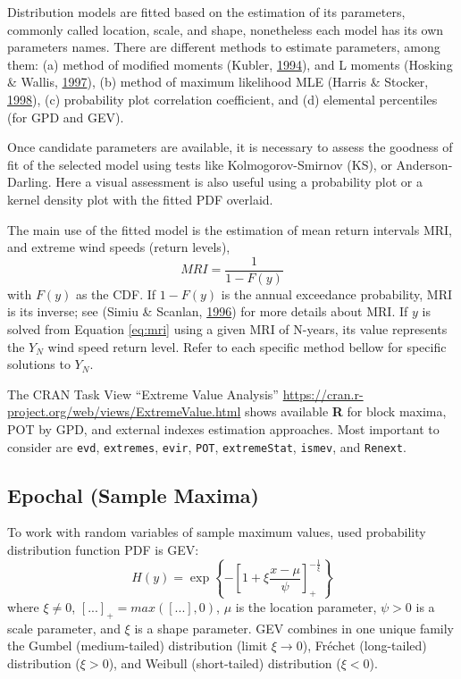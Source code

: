\documentclass[12pt,oneside]{reedthesis}
\begin{document}
Distribution models are fitted based on the estimation of its parameters, commonly called location, scale, and shape, nonetheless each model has its own parameters names. There are different methods to estimate parameters, among them: (a) method of modified moments (Kubler, \protect\hyperlink{ref-Kubler1994}{1994}), and L moments (Hosking \& Wallis, \protect\hyperlink{ref-Hosking1997}{1997}), (b) method of maximum likelihood MLE (Harris \& Stocker, \protect\hyperlink{ref-Harris1994}{1998}), (c) probability plot correlation coefficient, and (d) elemental percentiles (for GPD and GEV).

Once candidate parameters are available, it is necessary to assess the goodness of fit of the selected model using tests like Kolmogorov-Smirnov (KS), or Anderson-Darling. Here a visual assessment is also useful using a probability plot or a kernel density plot with the fitted PDF overlaid.

The main use of the fitted model is the estimation of mean return intervals MRI, and extreme wind speeds (return levels),
\begin{equation}
        MRI=\frac{1}{1-F(y)}
  \label{eq:mri}
\end{equation}
with \(F(y)\) as the CDF. If \(1-F(y)\) is the annual exceedance probability, MRI is its inverse; see (Simiu \& Scanlan, \protect\hyperlink{ref-Simiu1996}{1996}) for more details about MRI. If \(y\) is solved from Equation \eqref{eq:mri} using a given MRI of N-years, its value represents the \(Y_N\) wind speed return level. Refer to each specific method bellow for specific solutions to \(Y_N\).

The CRAN Task View ``Extreme Value Analysis'' \url{https://cran.r-project.org/web/views/ExtremeValue.html} shows available \textbf{R} for block maxima, POT by GPD, and external indexes estimation approaches. Most important to consider are \texttt{evd}, \texttt{extremes}, \texttt{evir}, \texttt{POT}, \texttt{extremeStat}, \texttt{ismev}, and \texttt{Renext}.

\hypertarget{epochal-sample-maxima}{%
\subsection{Epochal (Sample Maxima)}\label{epochal-sample-maxima}}

To work with random variables of sample maximum values, used probability distribution function PDF is GEV:
\begin{equation}
        H(y) = \exp\left\{-\left[1+\xi\frac{x-\mu}{\psi}\right]_+^{-\frac{1}{\xi}}\right\}
  \label{eq:epochalpdf}
\end{equation}
where \(\xi\neq0\), \([...]_+ = max([...],0)\), \(\mu\) is the location parameter, \(\psi > 0\) is a scale parameter, and \(\xi\) is a shape parameter. GEV combines in one unique family the Gumbel (medium-tailed) distribution (limit \(\xi\rightarrow0\)), Fréchet (long-tailed) distribution (\(\xi>0\)), and Weibull (short-tailed) distribution (\(\xi<0\)).
\end{document}
